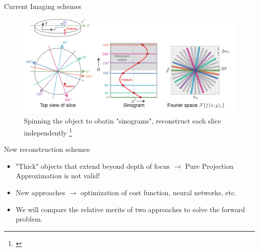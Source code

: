 \documentclass{beamer}
\begin{document}
\begin{frame}{Current Imaging schemes}
	\begin{center}
		\begin{figure}
			\includegraphics[scale=0.265]{ppa2}
			\caption{Spinning the object to obatin "sinograms", reconstruct each slice independently	\footnote{\cite{jacobsen_2019}}}
		\end{figure}
	\end{center}
\end{frame}

\begin{frame}{New reconstruction schemes}
\begin{itemize}
	\item "Thick" objects that extend beyond depth of focus $\rightarrow$ Pure Projection Approximation is not valid!
	\item New approaches $\rightarrow$ optimization of cost function\footnotemark,  neural networks\footnotemark, etc.
	\item We will compare the relative merits of two approaches to solve the forward problem.
\end{itemize}
\end{frame}
\end{document}
